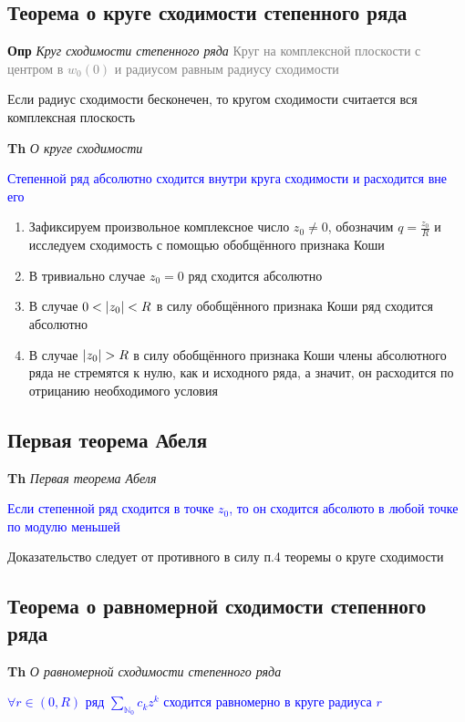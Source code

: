 \subsection{Теорема о круге сходимости степенного ряда}

\textbf{Опр} \textit{Круг сходимости степенного ряда} \textcolor{gray}{Круг на комплексной плоскости с центром
в $w_0 (0)$ и радиусом равным радиусу сходимости}

Если радиус сходимости бесконечен, то кругом сходимости считается вся комплексная плоскость

\textbf{Th} \textit{О круге сходимости}

\textcolor{blue}{Степенной ряд абсолютно сходится внутри круга сходимости и расходится вне его}

\begin{enumerate}
    \item Зафиксируем произвольное комплексное число $z_0 \neq 0$, обозначим $q = \frac{z_0}{R}$ и исследуем
    сходимость с помощью обобщённого признака Коши
    \item В тривиально случае $z_0 = 0$ ряд сходится абсолютно
    \item В случае $0 < \abs{z_0} < R$ в силу обобщённого признака Коши ряд сходится абсолютно
    \item В случае $\abs{z_0} > R$ в силу обобщённого признака Коши члены абсолютного ряда не стремятся к нулю,
    как и исходного ряда, а значит, он расходится по отрицанию необходимого условия
\end{enumerate}

\subsection{Первая теорема Абеля}

\textbf{Th} \textit{Первая теорема Абеля}

\textcolor{blue}{Если степенной ряд сходится в точке $z_0$, то он сходится абсолюто в любой точке по модулю
меньшей}

Доказательство следует от противного в силу п.4 теоремы о круге сходимости

\subsection{Теорема о равномерной сходимости степенного ряда}

\textbf{Th} \textit{О равномерной сходимости степенного ряда}

\textcolor{blue}{$\forall r \in (0, R)$ ряд $\sum_{\mathbb{N}}_0 c_k z^k$ сходится равномерно в круге радиуса $r$}

